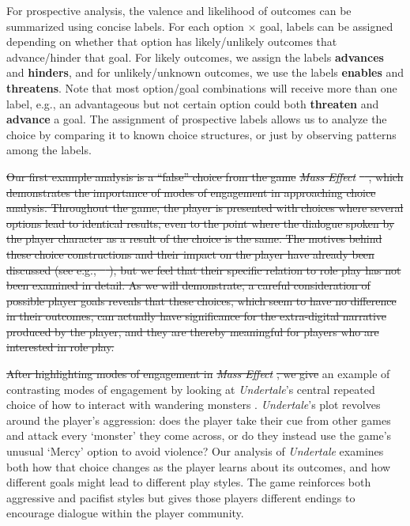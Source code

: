 \documentclass[arts,article,submit,moreauthors,pdftex,10pt,a4paper]{Definitions/mdpi}
\newcommand{\enables}{\textbf{\color{enables}enables}}
\newcommand{\advances}{\textbf{\color{advances}advances}}
\newcommand{\threatens}{\textbf{\color{threatens}threatens}}
\newcommand{\hinders}{\textbf{\color{hinders}hinders}}
\newcommand{\advancez}{\textbf{\color{advances}advance}}
\newcommand{\threatenz}{\textbf{\color{threatens}threaten}}
\providecommand{\DIFadd}[1]{{\protect\color{blue}\uwave{#1}}} %
\providecommand{\DIFdel}[1]{{\protect\color{red}\sout{#1}}}                      %
\providecommand{\DIFaddbegin}{} %
\providecommand{\DIFaddend}{} %
\providecommand{\DIFdelbegin}{} %
\providecommand{\DIFdelend}{} %
\begin{document}
\label{sec:prospective_labels}

For prospective analysis, the valence and likelihood of outcomes can be summarized using concise labels.
%
For each option $\times$ goal, labels can be assigned depending on whether that option has likely/unlikely outcomes that advance/hinder that goal.
%
For likely outcomes, we assign the labels \advances{} and \hinders{}, and for unlikely/unknown outcomes, we use the labels \enables{} and \threatens{}.
%
Note that most option/goal combinations will receive more than one label, e.g., an advantageous but not certain option could both \threatenz{} and \advancez{} a goal.
%
The assignment of prospective labels allows us to analyze the choice by comparing it to known choice structures, or just by observing patterns among the labels.


\DIFdelbegin \DIFdel{Our first example analysis is a ``false'' choice from the game }\emph{\DIFdel{Mass Effect}} %
\DIFdel{\mbox{%
\citep{bioware2007mass}}\hspace{0pt}%
, which demonstrates the importance of modes of engagement in approaching choice analysis.
Throughout the game, the player is presented with choices where several options lead to identical results, even to the point where the dialogue spoken by the player character as a result of the choice is the same.
The motives behind these choice constructions and their impact on the player have already been discussed (see e.g., \mbox{%
\cite{jorgensen2010game,bizzocchi2012mass,boyan2015massively}}\hspace{0pt}%
), but we feel that their specific relation to role play has not been examined in detail.
As we will demonstrate, a careful consideration of possible player goals reveals that these choices, which seem to have no difference in their outcomes, can actually have significance for the extra-digital narrative produced by the player, and they are thereby meaningful for players who are interested in role play.
}%

\DIFdel{After highlighting modes of engagement in }\emph{\DIFdel{Mass Effect}}%
\DIFdel{, we give }\DIFdelend \DIFaddbegin \DIFadd{We start with }\DIFaddend an example of contrasting modes of engagement by looking at \emph{Undertale}'s central repeated choice of how to interact with wandering monsters \citep{fox2015undertale}.
%
\emph{Undertale}'s plot revolves around the player's aggression: does the player take their cue from other games and attack every `monster' they come across, or do they instead use the game's unusual `Mercy' option to avoid violence?
%
Our analysis of \emph{Undertale} examines both how that choice changes as the player learns about its outcomes, and how different goals might lead to different play styles.
%
The game reinforces both aggressive and pacifist styles but gives those players different endings to encourage dialogue within the player community.
\end{document}
